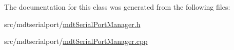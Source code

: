 The documentation for this class was generated from the following files\-:\begin{DoxyCompactItemize}
\item 
src/mdtserialport/\hyperlink{mdt_serial_port_manager_8h}{mdt\-Serial\-Port\-Manager.\-h}\item 
src/mdtserialport/\hyperlink{mdt_serial_port_manager_8cpp}{mdt\-Serial\-Port\-Manager.\-cpp}\end{DoxyCompactItemize}
